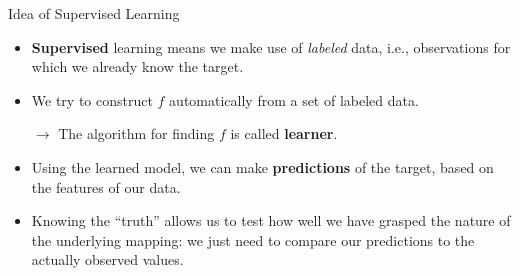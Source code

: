 \documentclass[11pt,compress,t,notes=noshow, xcolor=table]{beamer}
\begin{document}
\begin{vbframe}{Idea of Supervised Learning}
\begin{itemize}
  \item \textbf{Supervised} learning means we make use of \emph{labeled}
  data, i.e., observations for which we already know the target.
  
  \item We try to construct $f$ automatically from a set of labeled data.
  
  $\rightarrow$ The algorithm for finding $f$ is called \textbf{learner}.
  
  \item Using the learned model, we can make \textbf{predictions} of the target, based on
  the features of our data.
  
  \item Knowing the \enquote{truth} allows us to test how well we have grasped 
  the nature of the underlying mapping: we just need to compare our predictions 
  to the actually observed values.
  

\end{itemize}

\end{vbframe}

\end{document}
